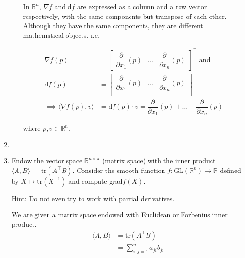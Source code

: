 \documentclass{article}
\begin{document}
\begin{enumerate}[start=9]
\begin{enumerate}
\begin{ans_box}
    In $\mathbb{R}^n$, $\nabla f$ and $\text{d}f$ are expressed as a column and a row vector respectively, with the same components but transpose of each other. Although they have the same components, they are different mathematical objects. i.e.

    \begin{equation*}
      \begin{split}
        \nabla f(p)&=
        \begin{bmatrix}
          \dfrac{\partial}{\partial x_{1}}(p)&\hdots&\dfrac{\partial}{\partial x_{n}}(p)
        \end{bmatrix}^{\top}\text{ and}\\
        \text{d}f(p)&=
        \begin{bmatrix}
          \dfrac{\partial}{\partial x_{1}}(p)&\hdots&\dfrac{\partial}{\partial x_{n}}(p)\\
        \end{bmatrix}\\
        \implies\langle\nabla f(p), v\rangle&=\text{d}f(p)\cdot v=\dfrac{\partial}{\partial x_{1}}(p)+\hdots+\dfrac{\partial}{\partial x_{n}}(p)
      \end{split}
    \end{equation*}

    where $p,v\in\mathbb{R}^{n}$.
    \end{ans_box}
  \end{enumerate}

  \item

  \item Endow the vector space $\mathbb{R}^{n\times n}$ (matrix space) with the inner product $\langle A,B\rangle:=\text{tr}(A^{\top}B)$. Consider the smooth function $f:\text{GL}(\mathbb{R}^{n})\rightarrow\mathbb{R}$ defined by $X\mapsto\text{tr}(X^{-1})$ and compute grad$f(X)$.

  {\footnotesize Hint: Do not even try to work with partial derivatives.}

  \begin{ans_box}
    We are given a matrix space endowed with Euclidean or Forbenius inner product.
    \begin{equation*}
      \begin{split}
        \langle A,B\rangle&=\text{tr}(A^{\top}B)\\
        &=\sum_{i,j=1}^{n}a_{ji}b_{ji}
      \end{split}
    \end{equation*}


\end{ans_box}
\end{enumerate}
\end{document}
